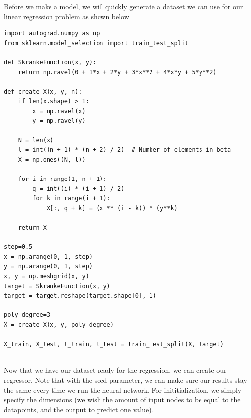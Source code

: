 \documentclass{beamer}
\begin{document}
\begin{frame}
\begin{verbatim}
\end{verbatim}


Before we make a model, we will quickly generate a dataset we can use
for our linear regression problem as shown below




































\begin{verbatim}
import autograd.numpy as np
from sklearn.model_selection import train_test_split

def SkrankeFunction(x, y):
    return np.ravel(0 + 1*x + 2*y + 3*x**2 + 4*x*y + 5*y**2)

def create_X(x, y, n):
    if len(x.shape) > 1:
        x = np.ravel(x)
        y = np.ravel(y)

    N = len(x)
    l = int((n + 1) * (n + 2) / 2)  # Number of elements in beta
    X = np.ones((N, l))

    for i in range(1, n + 1):
        q = int((i) * (i + 1) / 2)
        for k in range(i + 1):
            X[:, q + k] = (x ** (i - k)) * (y**k)

    return X

step=0.5
x = np.arange(0, 1, step)
y = np.arange(0, 1, step)
x, y = np.meshgrid(x, y)
target = SkrankeFunction(x, y)
target = target.reshape(target.shape[0], 1)

poly_degree=3
X = create_X(x, y, poly_degree)

X_train, X_test, t_train, t_test = train_test_split(X, target)


\end{verbatim}


Now that we have our dataset ready for the regression, we can create
our regressor. Note that with the seed parameter, we can make sure our
results stay the same every time we run the neural network. For
inititialization, we simply specify the dimensions (we wish the amount
of input nodes to be equal to the datapoints, and the output to
predict one value).








\end{frame}
\end{document}
